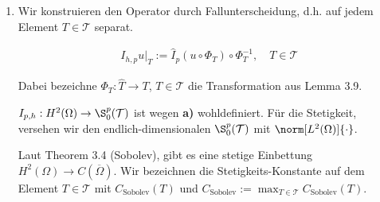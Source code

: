 \begin{solution}
\begin{enumerate}[label = \textbf{\alph*)}]
  \item Wir konstruieren den Operator durch Fallunterscheidung, d.h. auf jedem Element $T \in \mathcal{T}$ separat.
  
  \begin{align*}
    I_{h, p} u|_T := \hat I_p(u \circ \Phi_T) \circ \Phi_T^{-1},
    \quad
    T \in \mathcal{T}
  \end{align*}

  Dabei bezeichne $\Phi_T: \hat T \to T$, $T \in \mathcal{T}$ die Transformation aus Lemma 3.9.


  $I_{p, h}: H^2(\Omega) \to \S_0^p(\mathcal{T})$ ist wegen \textbf{a)} wohldefiniert.
  Für die Stetigkeit, versehen wir den endlich-dimensionalen $\S_0^p(\mathcal{T})$ mit $\norm[L^2(\Omega)]{\cdot}$.

  Laut Theorem 3.4 (Sobolev), gibt es eine stetige Einbettung $H^2(\Omega) \to C(\overline{\Omega})$.
  Wir bezeichnen die Stetigkeits-Konstante auf dem Element $T \in \mathcal{T}$ mit $C_\mathrm{Sobolev}(T)$ und $C_\mathrm{Sobolev} := \max_{T \in \mathcal{T}} C_\mathrm{Sobolev}(T)$.



\end{enumerate}
\end{solution}
